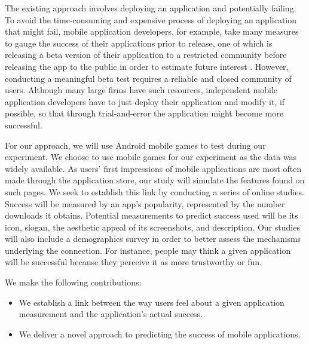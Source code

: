 The existing approach involves deploying an application and potentially failing. To avoid the time-consuming and expensive process of deploying an application that might fail, mobile application developers, for example, take many measures to gauge the success of their applications prior to release, one of which is releasing a beta version of their application to a restricted community before releasing the app to the public in order to estimate future interest \cite{needsource}. However, conducting a meaningful beta test requires a reliable and closed community of users. Although many large firms have such resources, independent mobile application developers have to just deploy their application and modify it, if possible, so that through trial-and-error the application might become more successful.

For our approach, we will use Android mobile games to test during our experiment. We choose to use mobile games for our experiment as the data was widely available. As users' first impressions of mobile applications are most often made through the application store, our study will simulate the features found on such pages. We seek to establish this link by conducting a series of online studies. Success will be measured by an app's popularity, represented by the number downloads it obtains. Potential measurements to predict success used will be its icon, slogan, the aesthetic appeal of its screenshots, and description. Our studies will also include a demographics survey in order to better assess the mechanisms underlying the connection. For instance, people may think a given application will be successful because they perceive it as more trustworthy or fun.

We make the following contributions:
\begin{itemize}
\item We establish a link between the way users feel about a given application measurement and the application's actual success.
\item We deliver a novel approach to predicting the success of mobile applications.
\end{itemize}

